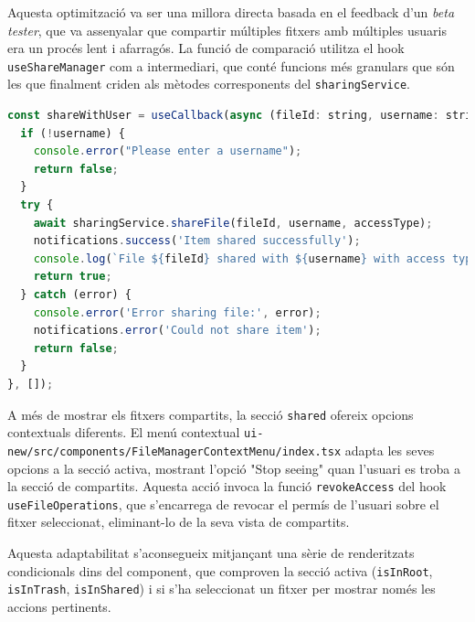 Aquesta optimització va ser una millora directa basada en el feedback d'un \textit{beta tester}, que va assenyalar que compartir múltiples fitxers amb múltiples usuaris era un procés lent i afarragós. La funció de comparació utilitza el hook \texttt{useShareManager} com a intermediari, que conté funcions més granulars que són les que finalment criden als mètodes corresponents del \texttt{sharingService}.

\begin{lstlisting}[language=javascript, caption={Funció per compartir amb un usuari a `useShareManager.ts`}]
const shareWithUser = useCallback(async (fileId: string, username: string, accessType: 'READ' | 'WRITE' = 'READ') => {
  if (!username) {
    console.error("Please enter a username");
    return false;
  }
  try {
    await sharingService.shareFile(fileId, username, accessType);   
    notifications.success('Item shared successfully');
    console.log(`File ${fileId} shared with ${username} with access type ${accessType}`);
    return true;
  } catch (error) {
    console.error('Error sharing file:', error);
    notifications.error('Could not share item');
    return false;
  }
}, []);
\end{lstlisting}

A més de mostrar els fitxers compartits, la secció \texttt{shared} ofereix opcions contextuals diferents. El menú contextual \texttt{ui-new/src/components/FileManagerContextMenu/index.tsx} adapta les seves opcions a la secció activa, mostrant l'opció "Stop seeing" quan l'usuari es troba a la secció de compartits. Aquesta acció invoca la funció \texttt{revokeAccess} del hook \texttt{useFileOperations}, que s'encarrega de revocar el permís de l'usuari sobre el fitxer seleccionat, eliminant-lo de la seva vista de compartits.

Aquesta adaptabilitat s'aconsegueix mitjançant una sèrie de renderitzats condicionals dins del component, que comproven la secció activa (\texttt{isInRoot}, \texttt{isInTrash}, \texttt{isInShared}) i si s'ha seleccionat un fitxer per mostrar només les accions pertinents.

